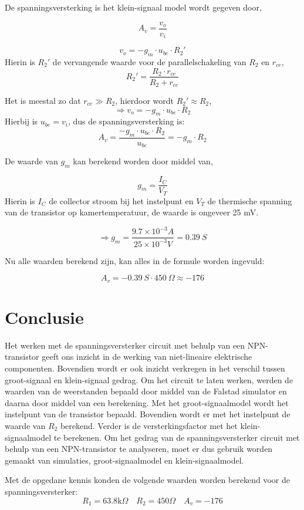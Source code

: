 \documentclass{article}
\begin{document}
De spanningsversterking is het klein-signaal model wordt gegeven door,

\begin{equation}
A_v=\frac{v_o}{v_i}
\end{equation}

\begin{equation}
v_o=-g_m\cdot u_{be}\cdot R_2'
\end{equation}
Hierin is $R_2'$ de vervangende waarde voor de parallelschakeling van $R_2$ en $r_{ce}$,
$$R_2'=\frac{R_2\cdot r_{ce}}{R_2+r_{ce}}$$

\noindent Het is meestal zo dat $r_{ce}\gg R_2$, hierdoor wordt $R_2'\approx R_2$,
$$\Rightarrow v_o=-g_m\cdot u_{be}\cdot R_2$$
Hierbij is $u_{be}=v_i$, dus de spanningsversterking is:
$$A_v=\frac{-g_m\cdot u_{be}\cdot R_2}{u_{be}}=-g_m\cdot R_2$$

\noindent De waarde van $g_m$ kan berekend worden door middel van,

\begin{equation}
g_m=\frac{I_C}{V_T}
\end{equation}
Hierin is $I_C$ de collector stroom bij het instelpunt en $V_T$ de thermische spanning van de transistor op kamertemperatuur, de waarde is ongeveer 25 mV.

$$\Rightarrow g_m=\frac{9.7\times 10^{-3}A}{25\times 10^{-3}V}= 0.39 \: S$$

Nu alle waarden berekend zijn, kan alles in de formule worden ingevuld:

$$A_v= -0.39 \: S\cdot 450 \: \Omega\approx -176 $$

\section*{Conclusie}
Het werken met de spanningsversterker circuit met behulp van een NPN-transistor geeft ons inzicht in de werking van niet-lineaire elektrische componenten. Bovendien wordt er ook inzicht verkregen in het verschil tussen groot-signaal en klein-signaal gedrag.
Om het circuit te laten werken, werden de waarden van de weerstanden bepaald door middel van de Falstad simulator en daarna door middel van een berekening.
Met het groot-signaalmodel wordt het instelpunt van de transistor bepaald. Bovendien wordt er met het instelpunt de waarde van $R_2$ berekend. Verder is de versterkingsfactor met het klein-signaalmodel te berekenen. 
Om het gedrag van de spanningsversterker circuit met behulp van een NPN-transistor te analyseren, moet er dus gebruik worden gemaakt van simulaties, groot-signaalmodel en klein-signaalmodel.

Met de opgedane kennis konden de volgende waarden worden berekend voor de spanningsversterker:
$$R_{1} = 63.8 \mathrm{k}\Omega \quad R_{2} = 450 \Omega \quad A_{v} = -176$$

\newpage
\printbibliography
\end{document}
